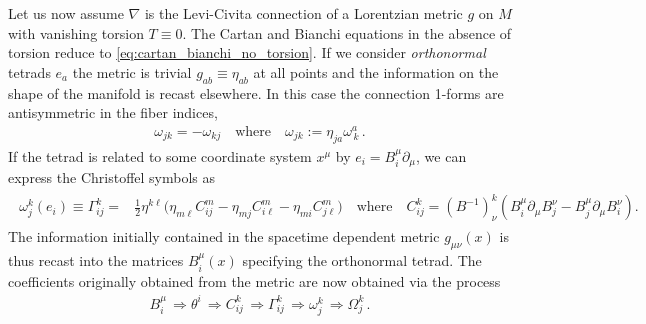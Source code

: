 \documentclass[../geometry_main.tex]{subfiles}
\begin{document}
\begin{mytheorem}
%
Let us now assume $\nabla$ is the Levi-Civita connection of a Lorentzian metric $g$ on $M$ with vanishing torsion $T\equiv 0$.
The Cartan and Bianchi equations in the absence of torsion reduce to \eqref{eq:cartan_bianchi_no_torsion}.
If we consider \emph{orthonormal} tetrads $e_a$ the metric is trivial $g_{ab}\equiv \eta_{ab}$ at all points and the information on the shape of the manifold is recast elsewhere.
In this case the connection 1-forms are antisymmetric in the fiber indices, 
\begin{align}
    \omega_{jk}=-\omega_{kj}\quad \text{where}\quad \omega_{jk}:=\eta_{j a} \omega^a_{\, k}\,.
\end{align}
If the tetrad is related to some coordinate system $x^\mu$ by $e_i = B_i^\mu \partial_\mu$, we can express the Christoffel symbols as
\begin{align}
\begin{aligned}
    \omega_j^k(e_i)\equiv \Gamma_{ij}^k=&\tfrac{1}{2} \eta^{k\ell} \Big( \eta_{m \ell} C^m_{ij} - \eta_{m j} C^m_{i \ell} - \eta_{m i} C^m_{j \ell} \Big)\quad \text{where}\quad C_{ij}^k= (B^{-1})^k_\nu \left( B_i^\mu \partial_\mu B_j^\nu - B_j^\mu \partial_\mu B_i^\nu \right).
\end{aligned}
\end{align} 
The information initially contained in the spacetime dependent metric $g_{\mu\nu}(x)$ is thus recast into the matrices $B_i^\mu(x)$ specifying the orthonormal tetrad.
The coefficients originally obtained from the metric are now obtained via the process 
\begin{align}
    B_i^\mu\, \Longrightarrow \theta^i\,\Longrightarrow C_{ij}^k\, \Longrightarrow \Gamma_{ij}^k\, \Longrightarrow \omega_j^k\, \Longrightarrow \Omega_j^k\,.
\end{align}
\end{mytheorem}



\end{document}

